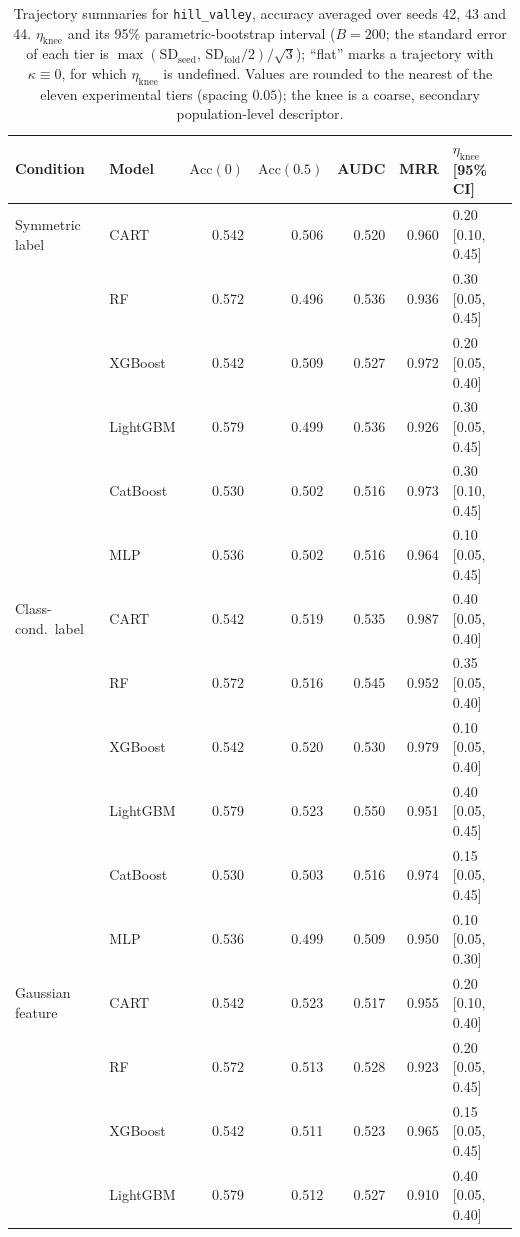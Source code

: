\begin{table}[p]
\centering
\scriptsize
\setlength{\tabcolsep}{3.5pt}
\caption{Trajectory summaries for \texttt{hill\_valley}, accuracy averaged over seeds 42, 43 and 44. $\eta_{\mathrm{knee}}$ and its 95\% parametric-bootstrap interval ($B=200$; the standard error of each tier is $\max(\mathrm{SD}_{\mathrm{seed}},\,\mathrm{SD}_{\mathrm{fold}}/2)/\sqrt3$); ``flat'' marks a trajectory with $\kappa\equiv 0$, for which $\eta_{\mathrm{knee}}$ is undefined. Values are rounded to the nearest of the eleven experimental tiers (spacing $0.05$); the knee is a coarse, secondary population-level descriptor.}
\label{tab:traj_hill_valley}
\begin{tabular}{@{}llrrrrl@{}}
\toprule
Condition & Model & $\mathrm{Acc}(0)$ & $\mathrm{Acc}(0.5)$ & AUDC & MRR & $\eta_{\mathrm{knee}}$ [95\% CI] \\
\midrule
Symmetric label & CART & 0.542 & 0.506 & 0.520 & 0.960 & 0.20 [0.10, 0.45] \\
 & RF & 0.572 & 0.496 & 0.536 & 0.936 & 0.30 [0.05, 0.45] \\
 & XGBoost & 0.542 & 0.509 & 0.527 & 0.972 & 0.20 [0.05, 0.40] \\
 & LightGBM & 0.579 & 0.499 & 0.536 & 0.926 & 0.30 [0.05, 0.45] \\
 & CatBoost & 0.530 & 0.502 & 0.516 & 0.973 & 0.30 [0.10, 0.45] \\
 & MLP & 0.536 & 0.502 & 0.516 & 0.964 & 0.10 [0.05, 0.45] \\
\midrule
Class-cond.\ label & CART & 0.542 & 0.519 & 0.535 & 0.987 & 0.40 [0.05, 0.40] \\
 & RF & 0.572 & 0.516 & 0.545 & 0.952 & 0.35 [0.05, 0.40] \\
 & XGBoost & 0.542 & 0.520 & 0.530 & 0.979 & 0.10 [0.05, 0.40] \\
 & LightGBM & 0.579 & 0.523 & 0.550 & 0.951 & 0.40 [0.05, 0.45] \\
 & CatBoost & 0.530 & 0.503 & 0.516 & 0.974 & 0.15 [0.05, 0.45] \\
 & MLP & 0.536 & 0.499 & 0.509 & 0.950 & 0.10 [0.05, 0.30] \\
\midrule
Gaussian feature & CART & 0.542 & 0.523 & 0.517 & 0.955 & 0.20 [0.10, 0.40] \\
 & RF & 0.572 & 0.513 & 0.528 & 0.923 & 0.20 [0.05, 0.45] \\
 & XGBoost & 0.542 & 0.511 & 0.523 & 0.965 & 0.15 [0.05, 0.45] \\
 & LightGBM & 0.579 & 0.512 & 0.527 & 0.910 & 0.40 [0.05, 0.40] \\

\end{tabular}
\end{table}
